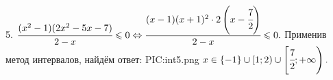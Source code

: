 5. $\cfrac{(x^2-1)(2x^2-5x-7)}{2-x}\leqslant0\Leftrightarrow\cfrac{(x-1)(x+1)^2\cdot 2\left(x-\cfrac{7}{2}\right)}{2-x}\leqslant0.$ Применив метод интервалов, найдём ответ:
{{PIC:int5.png}}
$x\in\{-1\}\cup[1;2)\cup\left[\cfrac{7}{2};+\infty\right).$\\
